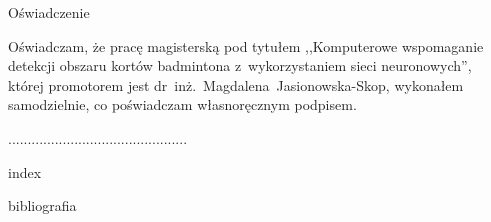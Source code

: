 \documentclass[a4paper,11pt,twoside,openright]{report}
\theoremstyle{definition}
\newcommand{\tytul}{Komputerowe wspomaganie detekcji obszaru kortów badmintona z~wykorzystaniem sieci neuronowych}
\newcommand{\type}{magisters} %
\newcommand{\supervisor}{\mbox{dr inż. Magdalena Jasionowska-Skop}}
\begin{document}
\begin{center}
Oświadczenie
\end{center}

\indent Oświadczam, że pracę \type ką pod
tytułem ,,\tytul '', której promotorem jest \supervisor , wykonałem
samodzielnie, co poświadczam własnoręcznym podpisem.
\vspace{2cm}


\begin{flushright}
  \begin{minipage}{50mm}
    \begin{center}
      ..............................................

    \end{center}
  \end{minipage}
\end{flushright}

\thispagestyle{empty}
\newpage

\null\thispagestyle{empty}\newpage


\tableofcontents
\thispagestyle{empty}


\null\thispagestyle{empty}\newpage
\pagestyle{fancy}
\setcounter{page}{11} %

{index}


{bibliografia}
\newpage
\thispagestyle{empty}



%
\end{document}
